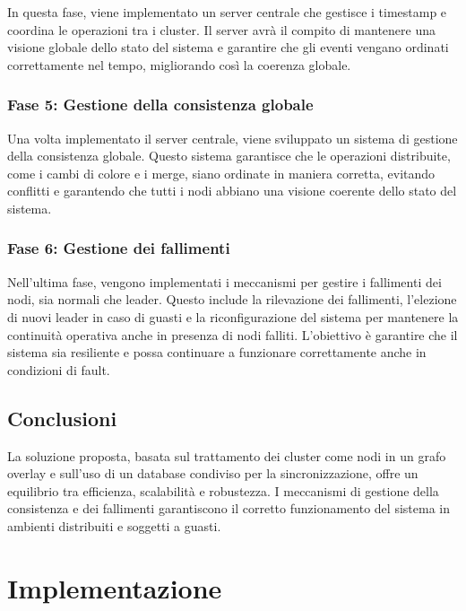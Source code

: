 \documentclass[12pt, a4paper]{report}
\begin{document}
In questa fase, viene implementato un server centrale che gestisce i timestamp e coordina le operazioni tra i cluster. Il server avr\`a il compito di mantenere una visione globale dello stato del sistema e garantire che gli eventi vengano ordinati correttamente nel tempo, migliorando così la coerenza globale.

\subsection*{Fase 5: Gestione della consistenza globale}

Una volta implementato il server centrale, viene sviluppato un sistema di gestione della consistenza globale. Questo sistema garantisce che le operazioni distribuite, come i cambi di colore e i merge, siano ordinate in maniera corretta, evitando conflitti e garantendo che tutti i nodi abbiano una visione coerente dello stato del sistema.

\subsection*{Fase 6: Gestione dei fallimenti}

Nell'ultima fase, vengono implementati i meccanismi per gestire i fallimenti dei nodi, sia normali che leader. Questo include la rilevazione dei fallimenti, l'elezione di nuovi leader in caso di guasti e la riconfigurazione del sistema per mantenere la continuit\`a operativa anche in presenza di nodi falliti. L'obiettivo \`e garantire che il sistema sia resiliente e possa continuare a funzionare correttamente anche in condizioni di fault.

\section{Conclusioni}

La soluzione proposta, basata sul trattamento dei cluster come nodi in un grafo overlay e sull'uso di un database condiviso per la sincronizzazione, offre un equilibrio tra efficienza, scalabilit\`a e robustezza. I meccanismi di gestione della consistenza e dei fallimenti garantiscono il corretto funzionamento del sistema in ambienti distribuiti e soggetti a guasti.

\newpage

\chapter{Implementazione}
\end{document}
